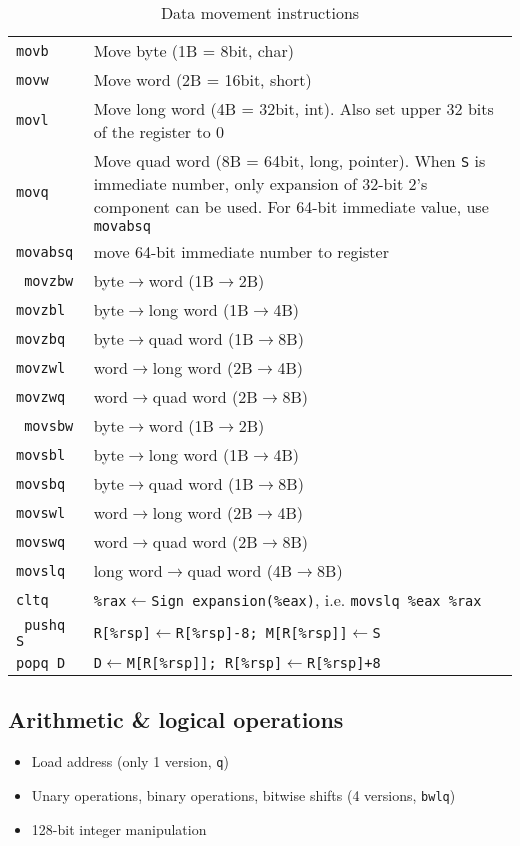 \begin{table}[ht]
\caption{Data movement instructions}
\begin{tabular}{>{\tt}lm{300pt}}\toprule
movb & Move byte (1B = 8bit, char)\\
movw & Move word (2B = 16bit, short)\\
movl & Move long word (4B = 32bit, int). Also set upper 32 bits of the register to 0\\
movq & Move quad word (8B = 64bit, long, pointer). When \texttt{S} is immediate number, only expansion of 32-bit 2's component can be used. For 64-bit immediate value, use \texttt{movabsq}\\
movabsq & move 64-bit immediate number to register\\\midrule
movzbw & byte$\rightarrow$word (1B$\rightarrow$2B)\\
movzbl & byte$\rightarrow$long word (1B$\rightarrow$4B)\\
movzbq & byte$\rightarrow$quad word (1B$\rightarrow$8B)\\
movzwl & word$\rightarrow$long word (2B$\rightarrow$4B)\\
movzwq & word$\rightarrow$quad word (2B$\rightarrow$8B)\\\midrule
movsbw & byte$\rightarrow$word (1B$\rightarrow$2B)\\
movsbl & byte$\rightarrow$long word (1B$\rightarrow$4B)\\
movsbq & byte$\rightarrow$quad word (1B$\rightarrow$8B)\\
movswl & word$\rightarrow$long word (2B$\rightarrow$4B)\\
movswq & word$\rightarrow$quad word (2B$\rightarrow$8B)\\
movslq & long word$\rightarrow$quad word (4B$\rightarrow$8B)\\
cltq & \texttt{\%rax$\leftarrow$Sign expansion(\%eax)}, i.e. \texttt{movslq \%eax \%rax}\\\midrule
pushq S & \texttt{R[\%rsp]$\leftarrow$R[\%rsp]-8; M[R[\%rsp]]$\leftarrow$S}\\
popq D & \texttt{D$\leftarrow$M[R[\%rsp]]; R[\%rsp]$\leftarrow$R[\%rsp]+8}\\\bottomrule
\end{tabular}
\end{table}

\subsection{Arithmetic \& logical operations}
\begin{itemize}
\item Load address (only 1 version, \texttt{q})
\item Unary operations, binary operations, bitwise shifts (4 versions, \texttt{bwlq})
\item 128-bit integer manipulation
\end{itemize}

